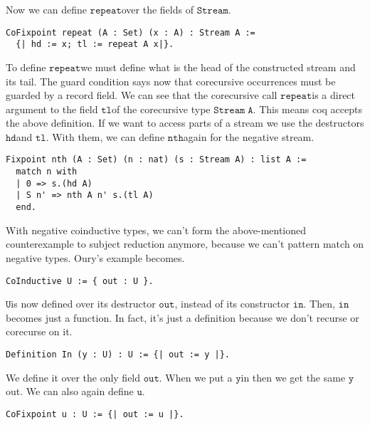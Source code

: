 \documentclass[a4paper,cleardoubleempty,BCOR1cm]{scrbook}
\begin{document}
Now we can define $\mathtt{repeat}$\;over the fields of $\mathtt{Stream}$.

\begin{verbatim}
CoFixpoint repeat (A : Set) (x : A) : Stream A :=
  {| hd := x; tl := repeat A x|}.
\end{verbatim}

To define $\mathtt{repeat}$\;we must define what is the head of the constructed stream
and its tail.  The guard condition says now that corecursive
occurrences must be guarded by a record field.  We can see that the
corecursive call $\mathtt{repeat}$\;is a direct argument to the field $\mathtt{tl}$\;of the
corecursive type $\mathtt{Stream\;A}$.  This means coq accepts the above definition.
If we want to access parts of a stream we use the destructors $\mathtt{hd}$\;and
$\mathtt{tl}$.  With them, we can define $\mathtt{nth}$\;again for the negative stream.

\begin{verbatim}
Fixpoint nth (A : Set) (n : nat) (s : Stream A) : list A :=
  match n with
  | 0 => s.(hd A)
  | S n' => nth A n' s.(tl A)
  end.
\end{verbatim}

With negative coinductive types, we can't form the above-mentioned
counterexample to subject reduction anymore, because we can't pattern match
on negative types. Oury's example becomes.

\begin{verbatim}
CoInductive U := { out : U }.
\end{verbatim}

$\mathtt{U}$\;is now defined over its destructor $\mathtt{out}$, instead of its constructor
 $\mathtt{in}$. Then, $\mathtt{in}$\;\linebreak becomes just a function. In fact, it's just a
 definition because we don't recurse or corecurse on it.

\begin{verbatim}
Definition In (y : U) : U := {| out := y |}.
\end{verbatim}

We define it over the only field $\mathtt{out}$.  When we put a $\mathtt{y}$\;in then we get
the same $\mathtt{y}$\;out.  We can also again define $\mathtt{u}$.

\begin{verbatim}
CoFixpoint u : U := {| out := u |}.
\end{verbatim}
\end{document}

